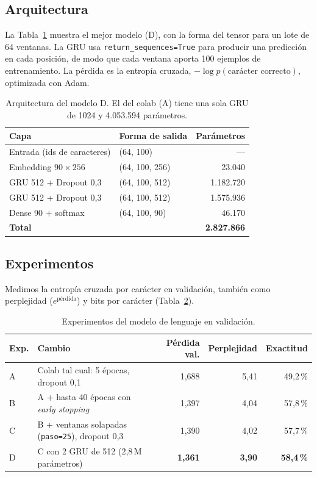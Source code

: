 \documentclass[12pt,a4paper]{article}
\begin{document}
\subsection{Arquitectura}

La Tabla~\ref{tab:arq-lm} muestra el mejor modelo (D), con la forma del tensor para un lote de 64 ventanas.
La GRU usa \texttt{return\_sequences=True} para producir una predicción en cada posición, de modo que cada
ventana aporta 100 ejemplos de entrenamiento. La pérdida es la entropía cruzada,
$-\log p(\text{carácter correcto})$, optimizada con Adam.

\begin{table}[H]
\centering\small
\begin{tabular}{llr}
\toprule
Capa & Forma de salida & Parámetros \\
\midrule
Entrada (ids de caracteres)            & (64, 100)      & --- \\
Embedding $90 \times 256$              & (64, 100, 256) & 23.040 \\
GRU 512 + Dropout 0,3                  & (64, 100, 512) & 1.182.720 \\
GRU 512 + Dropout 0,3                  & (64, 100, 512) & 1.575.936 \\
Dense 90 + softmax                     & (64, 100, 90)  & 46.170 \\
\midrule
\textbf{Total} & & \textbf{2.827.866} \\
\bottomrule
\end{tabular}
\caption{Arquitectura del modelo D. El del colab (A) tiene una sola GRU de 1024 y 4.053.594 parámetros.}
\label{tab:arq-lm}
\end{table}

\subsection{Experimentos}

Medimos la entropía cruzada por carácter en validación, también como perplejidad ($e^{\text{pérdida}}$)
y bits por carácter (Tabla~\ref{tab:exp-lm}).

\begin{table}[H]
\centering\small
\begin{tabular}{llrrr}
\toprule
Exp. & Cambio & Pérdida val. & Perplejidad & Exactitud \\
\midrule
A & Colab tal cual: 5 épocas, dropout 0,1                  & 1,688 & 5,41 & 49,2\,\% \\
B & A + hasta 40 épocas con \emph{early stopping}           & 1,397 & 4,04 & 57,8\,\% \\
C & B + ventanas solapadas (\texttt{paso=25}), dropout 0,3  & 1,390 & 4,02 & 57,7\,\% \\
D & C con 2 GRU de 512 (2,8\,M parámetros)                  & \textbf{1,361} & \textbf{3,90} & \textbf{58,4\,\%} \\
\bottomrule
\end{tabular}
\caption{Experimentos del modelo de lenguaje en validación.}
\label{tab:exp-lm}
\end{table}
\end{document}
